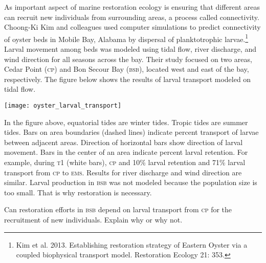 As important aspect of marine restoration ecology is ensuring that different areas can recruit new individuals from surrounding areas, a process called connectivity. Choong-Ki Kim and colleagues used computer simulations to predict connectivity of oyster beds in Mobile Bay, Alabama by dispersal of planktotrophic larvae.\footnote{Kim et al. 2013. Establishing restoration strategy of Eastern Oyster via a coupled biophysical transport model. Restoration Ecology 21: 353.} Larval movement among beds was modeled using tidal flow, river discharge, and wind direction for all seasons across the bay. Their study focused on two areas, Cedar Point (\textsc{cp}) and Bon Secour Bay (\textsc{bsb}), located west and east of the bay, respectively. The figure below shows the results of larval transport modeled on tidal flow.

\texttt{[image: oyster\_larval\_transport]}

In the figure above, equatorial tides are winter tides. Tropic tides are summer tides. Bars on area boundaries (dashed lines) indicate percent transport of larvae between adjacent areas. Direction of horizontal bars show direction of larval movement.  Bars in the center of an area indicate percent larval retention. For example, during \textsc{t1} (white bars), \textsc{cp} and 10\% larval retention and 71\% larval transport from \textsc{cp} to \textsc{ems}.  Results for river discharge and wind direction are similar. Larval production in \textsc{bsb} was not modeled because the population size is too small. That is why restoration is necessary.

\newpage

\question[5]\label{question:project}
Can restoration efforts in \textsc{bsb} depend on larval transport from \textsc{cp} for the recruitment of new individuals. Explain why or why not.

